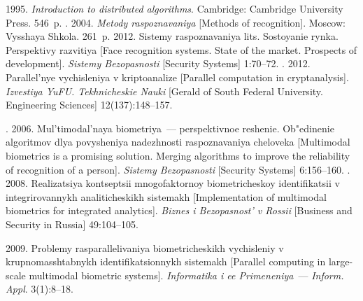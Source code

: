   \begin{multicols}{2}

\renewcommand{\bibname}{\protect\rmfamily References}



{\small\frenchspacing
 {%
 \begin{thebibliography}{99}

 1995. \textit{Introduction to distributed algorithms}.
Cambridge: Cambridge University Press. 546~p.
.
2004. \textit{Metody raspoznavaniya} [Methods of recognition].
Moscow: Vysshaya Shkola. 261~p.
 2012. Sistemy raspoznavaniya lits.
Sostoyanie rynka. Perspektivy razvitiya [Face recognition systems.
State of the market. Prospects of development].
\textit{Sistemy Bezopasnosti} [Security Systems] 1:70--72.
.
2012. Parallel'nye vychisleniya v kriptoanalize
[Parallel computation in cryptanalysis].
\textit{Izvestiya YuFU. Tekhnicheskie Nauki}
[Gerald of South Federal University. Engineering Sciences] 12(137):148--157.


. 2006.
Mul'timodal'naya biometriya~--- perspektivnoe reshenie. Ob"edinenie
algoritmov dlya povysheniya nadezhnosti raspoznavaniya cheloveka
[Multimodal biometrics is a promising solution. Merging algorithms
to improve the reliability of recognition of a person].
\textit{Sistemy Bezopasnosti} [Security Systems] 6:156--160.
. 2008. Realizatsiya
kontseptsii mnogofaktornoy biometricheskoy iden\-ti\-fi\-ka\-tsii v
integrirovannykh analiticheskikh sistemakh [Implementation of multimodal
biometrics for integrated analytics].
\textit{Biznes i Bezopasnost' v Rossii} [Business and Security in Russia]
49:104--105.

 2009. Problemy rasparallelivaniya biometricheskikh
vychisleniy v krupnomasshtabnykh identifikatsionnykh sistemakh
[Parallel computing in large-scale multimodal biometric systems].
\textit{Informatika i ee Primeneniya}~--- \textit{Inform. Appl}. 3(1):8--18.


\end{thebibliography}}}
\end{multicols}
